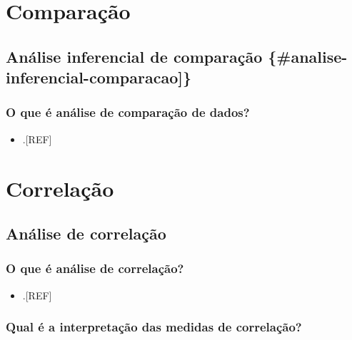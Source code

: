 \documentclass[
]{book}
\providecommand{\tightlist}{%
  \setlength{\itemsep}{0pt}\setlength{\parskip}{0pt}}
\begin{document}
\hypertarget{analise-comparacao}{%
\chapter{\texorpdfstring{\textbf{Comparação}}{Comparação}}\label{analise-comparacao}}

\hypertarget{anuxe1lise-inferencial-de-comparauxe7uxe3o-analise-inferencial-comparacao}{%
\section{Análise inferencial de comparação \{\#analise-inferencial-comparacao{]}\}}\label{anuxe1lise-inferencial-de-comparauxe7uxe3o-analise-inferencial-comparacao}}

\hypertarget{o-que-uxe9-anuxe1lise-de-comparauxe7uxe3o-de-dados}{%
\subsection{O que é análise de comparação de dados?}\label{o-que-uxe9-anuxe1lise-de-comparauxe7uxe3o-de-dados}}

\begin{itemize}
\tightlist
\item
  .{[}REF{]}
\end{itemize}

\hypertarget{analise-inferencial-correlacao}{%
\chapter{\texorpdfstring{\textbf{Correlação}}{Correlação}}\label{analise-inferencial-correlacao}}

\hypertarget{analise-correlacao}{%
\section{Análise de correlação}\label{analise-correlacao}}

\hypertarget{o-que-uxe9-anuxe1lise-de-correlauxe7uxe3o}{%
\subsection{O que é análise de correlação?}\label{o-que-uxe9-anuxe1lise-de-correlauxe7uxe3o}}

\begin{itemize}
\tightlist
\item
  .{[}REF{]}
\end{itemize}

\hypertarget{qual-uxe9-a-interpretauxe7uxe3o-das-medidas-de-correlauxe7uxe3o}{%
\subsection{Qual é a interpretação das medidas de correlação?}\label{qual-uxe9-a-interpretauxe7uxe3o-das-medidas-de-correlauxe7uxe3o}}
\end{document}
